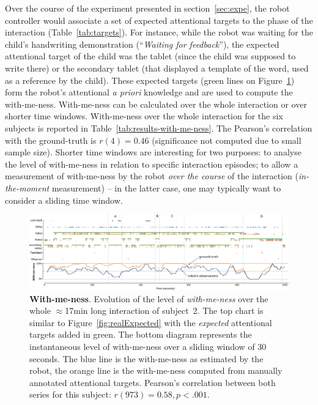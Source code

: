 \documentclass{sig-alternate}
\begin{document}
Over the course of the experiment presented in section~\ref{sec:expe}, the robot
controller would associate a set of expected attentional targets to the phase of
the interaction (Table~\ref{tab:targets}). For instance, while the robot was
waiting for the child's handwriting demonstration (``\textit{Waiting for
feedback}''), the expected attentional target of the child was the tablet (since
the child was supposed to write there) or the secondary tablet (that displayed a
template of the word, used as a reference by the child). These expected targets
(green lines on Figure~\ref{fig:with-me-ness}) form the robot's attentional {\it
a priori} knowledge and are used to compute the with-me-ness. With-me-ness can
be calculated over the whole interaction or over shorter time windows.
With-me-ness over the whole interaction for the six subjects is reported in
Table~\ref{tab:results-with-me-ness}. The Pearson's correlation with the
ground-truth is $r(4)=0.46$ (significance not computed due to small sample
size). Shorter time windows are interesting for two purposes: to analyse the
level of with-me-ness in relation to specific interaction episodes; to allow a
measurement of with-me-ness by the robot \emph{over the course} of the
interaction (\emph{in-the-moment} measurement) -- in the latter case, one may
typically want to consider a sliding time window.

\begin{figure}
    \centering
    \includegraphics[width=\linewidth]{with-me-ness}
    \caption{\small \textbf{With-me-ness}. Evolution of the level of
        \emph{with-me-ness} over the whole $\approx$17min long interaction of
        subject~2. The top chart is similar to Figure~\ref{fig:realExpected}
        with the \emph{expected} attentional targets added in green. The bottom
        diagram represents the instantaneous level of with-me-ness over a
        sliding window of 30 seconds. The blue line is the with-me-ness as estimated
        by the robot, the orange line is the with-me-ness computed from manually
        annotated attentional targets.  Pearson's correlation between both
        series for this subject: $r(973)=0.58, p < .001$.}

    \label{fig:with-me-ness}
\end{figure}
\end{document}

